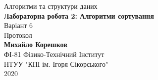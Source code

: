 \begin{center}
    \vspace*{1cm}
    \Huge
    Алгоритми та структури даних\\
    \textbf{Лабораторна робота 2: Алгоритми сортування}\\
    \Large
    Варіант 6\\
    \vspace{0.5cm}
    Протокол\\
    \vspace{1.5cm}
    \textbf{Михайло Корешков}\\
    ФІ-81
    \vfill
    Фізико-Технічний Інститут\\
    НТУУ "КПІ ім. Ігоря Сікорського"\\
    2020
\end{center}
\newpage